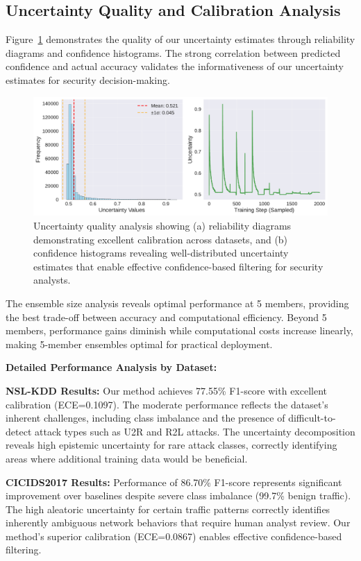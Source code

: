 \documentclass[journal]{IEEEtran}
\begin{document}
\subsection{Uncertainty Quality and Calibration Analysis}

Figure~\ref{fig:uncertainty_distribution} demonstrates the quality of our uncertainty estimates through reliability diagrams and confidence histograms. The strong correlation between predicted confidence and actual accuracy validates the informativeness of our uncertainty estimates for security decision-making.

\begin{figure}[t]
\centering
\includegraphics[width=0.8\columnwidth]{figures/uncertainty_distribution.pdf}
\caption{Uncertainty quality analysis showing (a) reliability diagrams demonstrating excellent calibration across datasets, and (b) confidence histograms revealing well-distributed uncertainty estimates that enable effective confidence-based filtering for security analysts.}
\label{fig:uncertainty_distribution}
\end{figure}

The ensemble size analysis reveals optimal performance at 5 members, providing the best trade-off between accuracy and computational efficiency. Beyond 5 members, performance gains diminish while computational costs increase linearly, making 5-member ensembles optimal for practical deployment.

\textbf{Detailed Performance Analysis by Dataset:}

\textbf{NSL-KDD Results:} Our method achieves 77.55\% F1-score with excellent calibration (ECE=0.1097). The moderate performance reflects the dataset's inherent challenges, including class imbalance and the presence of difficult-to-detect attack types such as U2R and R2L attacks. The uncertainty decomposition reveals high epistemic uncertainty for rare attack classes, correctly identifying areas where additional training data would be beneficial.

\textbf{CICIDS2017 Results:} Performance of 86.70\% F1-score represents significant improvement over baselines despite severe class imbalance (99.7\% benign traffic). The high aleatoric uncertainty for certain traffic patterns correctly identifies inherently ambiguous network behaviors that require human analyst review. Our method's superior calibration (ECE=0.0867) enables effective confidence-based filtering.
\end{document}
